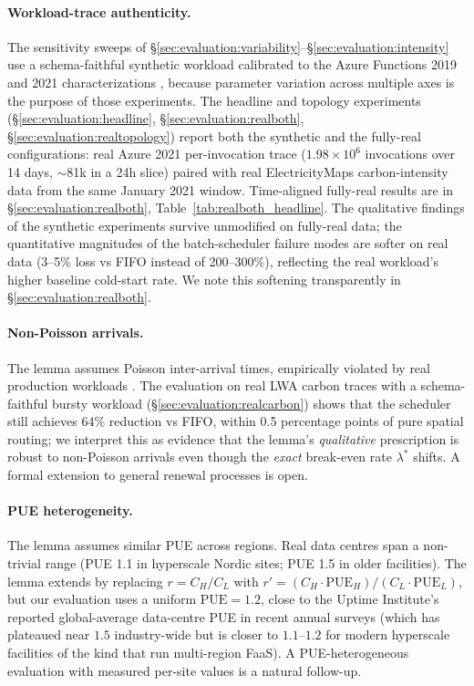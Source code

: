 \paragraph{Workload-trace authenticity.} The sensitivity sweeps of
\S\ref{sec:evaluation:variability}--\S\ref{sec:evaluation:intensity}
use a schema-faithful synthetic workload calibrated to the Azure
Functions 2019 and 2021 characterizations
\citep{shahrad2020serverless,zhang2021faster,azuretrace}, because
parameter variation across multiple axes is the purpose of those
experiments. The headline and topology experiments
(\S\ref{sec:evaluation:headline},
\S\ref{sec:evaluation:realboth},
\S\ref{sec:evaluation:realtopology})
report both the synthetic and the
fully-real configurations: real Azure 2021 per-invocation trace
($1.98 \times 10^6$ invocations over 14 days, $\sim$81k in a 24h
slice) paired with real ElectricityMaps carbon-intensity data from
the same January 2021 window. Time-aligned fully-real results are
in \S\ref{sec:evaluation:realboth}, Table~\ref{tab:realboth_headline}.
The qualitative findings of the synthetic experiments survive
unmodified on fully-real data; the quantitative magnitudes of the
batch-scheduler failure modes are softer on real data (3--5\% loss vs
FIFO instead of 200--300\%), reflecting the real workload's higher
baseline cold-start rate. We note this softening transparently in
\S\ref{sec:evaluation:realboth}.

\paragraph{Non-Poisson arrivals.} The lemma assumes Poisson
inter-arrival times, empirically violated by real production
workloads \citep{shahrad2020serverless}. The evaluation on real LWA
carbon traces with a schema-faithful bursty workload
(\S\ref{sec:evaluation:realcarbon}) shows that the scheduler still
achieves 64\% reduction vs FIFO, within 0.5 percentage points of
pure spatial routing; we interpret this as evidence that the lemma's
\emph{qualitative} prescription is robust to non-Poisson arrivals
even though the \emph{exact} break-even rate $\lambda^*$ shifts. A
formal extension to general renewal processes is open.

\paragraph{PUE heterogeneity.} The lemma assumes similar PUE across
regions. Real data centres span a non-trivial range (PUE 1.1 in
hyperscale Nordic sites; PUE 1.5 in older facilities). The lemma
extends by replacing $r = C_H/C_L$ with
$r' = (C_H \cdot \mathrm{PUE}_H)/(C_L \cdot \mathrm{PUE}_L)$, but our
evaluation uses a uniform $\mathrm{PUE} = 1.2$, close to the Uptime
Institute's reported global-average data-centre PUE in recent annual
surveys (which has plateaued near $1.5$ industry-wide but is closer
to $1.1$--$1.2$ for modern hyperscale facilities of the kind that run
multi-region FaaS). A PUE-heterogeneous
evaluation with measured per-site values is a natural follow-up.

